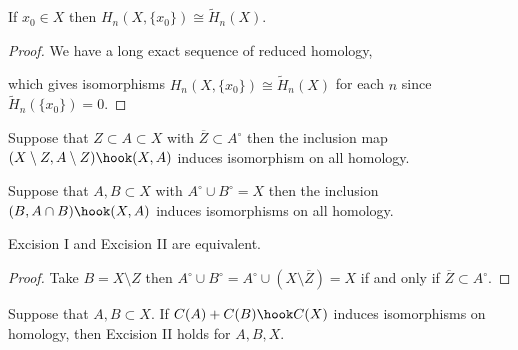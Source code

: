 \documentclass[12pt]{extarticle}
\begin{document}
\begin{corollary}
If $x_0 \in X$ then $H_n(X, \{x_0\}) \cong \tilde{H}_n(X)$.
\end{corollary}

\begin{proof}
We have a long exact sequence of reduced homology,
\begin{center}
\end{center} 
which gives isomorphisms $H_n(X, \{x_0\}) \cong \tilde{H}_n(X)$ for each $n$ since $\tilde{H}_n(\{x_0\}) = 0$.
\end{proof}

\begin{theorem}[Excision I]
Suppose that $Z \subset A \subset X$ with $\overline{Z} \subset A^\circ$ then the inclusion map $(X \setminus Z, A \setminus Z) \hook (X, A)$ induces isomorphism on all homology.
\end{theorem}

\begin{theorem}[Excision II]
Suppose that $A, B \subset X$ with $A^\circ \cup B^\circ = X$ then the inclusion $(B, A \cap B) \hook (X, A)$ induces isomorphisms on all homology. 
\end{theorem}

\begin{lemma}
Excision I and Excision II are equivalent. 
\end{lemma}

\begin{proof}
Take $B = X \setminus Z$ then $A^\circ \cup B^\circ = A^\circ \cup (X \setminus \overline{Z}) = X$ if and only if $\overline{Z} \subset A^\circ$.  
\end{proof}

\begin{lemma}
Suppose that $A, B \subset X$. If $C(A) + C(B) \hook C(X)$ induces isomorphisms on homology, then Excision II holds for $A,B, X$.
\end{lemma}
\end{document}
